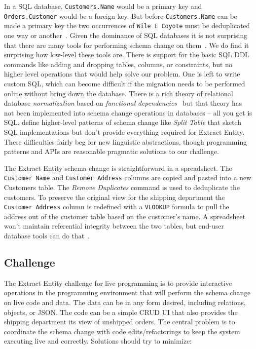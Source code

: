 \documentclass[english,submission]{programming}
\begin{document}
In a SQL database, \texttt{Customers.Name} would be a primary key and \texttt{Orders.Customer} would be a foreign key. But before \texttt{Customers.Name} can be made a primary key the two occurrences of \texttt{Wile E Coyote} must be deduplicated one way or another~\cite{dedupe}. Given the dominance of SQL databases it is not surprising that there are many tools for performing schema change on them~\cite{RailsMigrations, liquibase}. We do find it surprising how low-level these tools are. There is support for the basic SQL DDL commands like adding and dropping tables, columns, or constraints, but no higher level operations that would help solve our problem. One is left to write custom SQL, which can become difficult if the migration needs to be performed online without bring down the database. There is a rich theory of relational database \textit{normalization} based on \textit{functional dependencies}~\cite{Molina08} but that theory has not been implemented into schema change operations in databases -- all you get is SQL. \citet{ambler06} define higher-level patterns of schema change like \textit{Split Table} that sketch SQL implementations but don't provide everything required for Extract Entity. These difficulties fairly beg for new linguistic abstractions, though programming patterns and APIs are reasonable pragmatic solutions to our challenge.

The Extract Entity schema change is straightforward in a spreadsheet. The \texttt{Customer Name} and \texttt{Customer Address} columns are copied and pasted into a new Customers table. The \textit{Remove Duplicates} command is used to deduplicate the customers. To preserve the original view for the shipping department the \texttt{Customer Address} column is redefined with a \texttt{VLOOKUP} formula to pull the address out of the customer table based on the customer's name. A spreadsheet won't maintain referential integrity between the two tables, but end-user database tools can do that~\cite{airtable, notion}.

\subsection{Challenge}
The Extract Entity challenge for live programming is to provide interactive operations in the programming environment that will perform the schema change on live code and data. The data can be in any form desired, including relations, objects, or JSON. The code can be a simple CRUD UI that also provides the shipping department its view of unshipped orders. The central problem is to coordinate the schema change with code edits/refactorings to keep the system executing live and correctly. Solutions should try to minimize:
\end{document}
